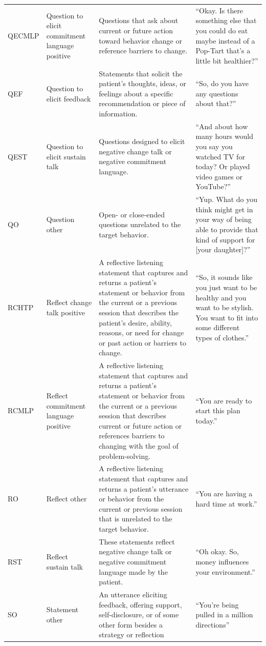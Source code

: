\begin{small}
\begin{longtable}{p{1.3cm}p{2cm}p{5cm}p{4.8cm}}
QECMLP & Question to elicit commitment language positive & Questions that ask about current or future action toward behavior change or reference barriers to change. & ``Okay.  Is there something else that you could do eat maybe instead of a Pop-Tart that’s a little bit healthier?''\\
QEF & Question to elicit feedback & Statements that solicit the patient’s thoughts, ideas, or feelings about a specific recommendation or piece of information. & ``So, do you have any questions about that?''\\
QEST & Question to elicit sustain talk & Questions designed to elicit negative change talk or negative commitment language. & ``And about how many hours would you say you watched TV for today?  Or played video games or YouTube?''\\
QO & Question other & Open- or close-ended questions unrelated to the target behavior. & ``Yup. What do you think might get in your way of being able to provide that kind of support for [your daughter]?''\\
RCHTP & Reflect change talk positive & A reflective listening statement that captures and returns a patient’s statement or behavior from the current or a previous session that describes the patient’s desire, ability, reasons, or need for change or past action or barriers to change. & ``So, it sounds like you just want to be healthy and you want to be stylish. You want to fit into some different types of clothes.''\\
RCMLP & Reflect commitment language positive & A reflective listening statement that captures and returns a patient’s statement or behavior from the current or a previous session that describes current or future action or references barriers to changing with the goal of problem-solving. & ``You are ready to start this plan today.''\\
RO & Reflect other & A reflective listening statement that captures and returns a patient’s utterance or behavior from the current or previous session that is unrelated to the target behavior. & ``You are having a hard time at work.''\\
RST & Reflect sustain talk & These statements reflect negative change talk or negative commitment language made by the patient. & ``Oh okay.  So, money influences your environment.''\\
SO & Statement other & An utterance eliciting feedback, offering support, self-disclosure, or of some other form besides a strategy or reflection & ``You’re being pulled in a million directions''\\

\end{longtable}
\end{small}
